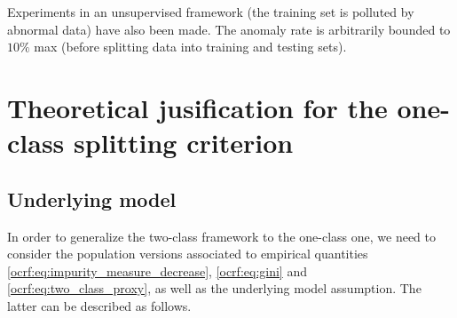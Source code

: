 Experiments in an unsupervised framework (the training set is polluted by
abnormal data) have also been made. %
The anomaly rate is arbitrarily bounded to $10\%$ max (before splitting data into training and testing sets).


\section{Theoretical jusification for the one-class splitting criterion}
\label{sec:theory}
\subsection{Underlying model}
\label{ocrf:sec:model}
In order to generalize the two-class framework to the one-class one, we need to consider the population versions associated to empirical quantities \eqref{ocrf:eq:impurity_measure_decrease}, \eqref{ocrf:eq:gini} and \eqref{ocrf:eq:two_class_proxy}, as well as the underlying model assumption. The latter can be described as follows.

